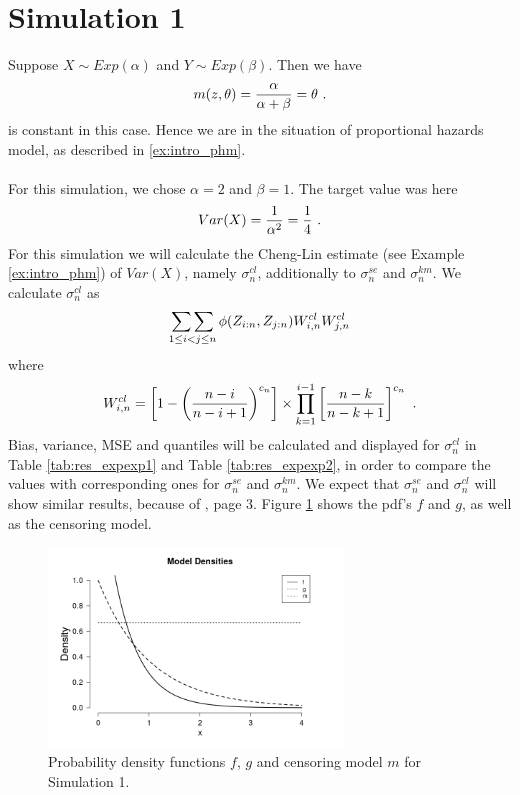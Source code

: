 \section{Simulation 1} \label{sec:sim_expexp}
Suppose $X \sim Exp(\alpha)$ and $Y\sim Exp(\beta)$. Then we have
$$m(z,\theta) = \frac{\alpha}{\alpha + \beta} = \theta\textrm{ .}$$
is constant in this case. Hence we are in the situation of proportional hazards model, as described in \ref{ex:intro_phm}.\\
\\
For this simulation, we chose $\alpha = 2$ and $\beta = 1$. The target value was here
$$Var(X) = \frac{1}{\alpha^2}=\frac{1}{4}\textrm{ .}$$
For this simulation we will calculate the Cheng-Lin estimate (see Example \ref{ex:intro_phm}) of $Var(X)$, namely $\sigma_n^{cl}$, additionally to $\sigma_n^{se}$ and $\sigma_n^{km}$. We calculate  $\sigma_n^{cl}$ as
$$\mathop{\sum\sum}\limits_{1\leq i < j \leq n} \phi(Z_{i:n}, Z_{j:n}) W_{i,n}^{cl} W_{j,n}^{cl}$$
where
$$W_{i,n}^{cl} = \left[1-\left(\frac{n-i}{n-i+1}\right)^{c_n}\right] \times \prod_{k=1}^{i-1}\left[\frac{n-k}{n-k+1}\right]^{c_n}\textrm{ .}$$
Bias, variance, MSE and quantiles will be calculated and displayed for $\sigma_n^{cl}$ in Table \ref{tab:res_expexp1} and Table \ref{tab:res_expexp2}, in order to compare the values with corresponding ones for $\sigma_n^{se}$ and $\sigma_n^{km}$. We expect that $\sigma_n^{se}$ and $\sigma_n^{cl}$ will show similar results, because of \cite{dikta2000strong}, page 3. Figure \ref{fig:dens_expexp} shows the pdf's $f$ and $g$, as well as the censoring model.
\begin{figure}[h!]
	\begin{center}
		\includegraphics[width=0.7\textwidth]{./figures/exp_exp_dens}
	\end{center}
	\caption{Probability density functions $f$, $g$ and censoring model $m$ for Simulation 1.}
	\label{fig:dens_expexp}
\end{figure}
